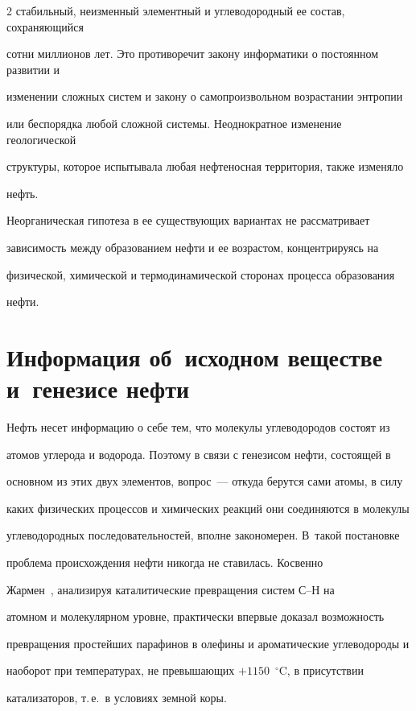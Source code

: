 \begin{multicols}{2}
стабильный, неизменный элементный и углеводородный ее состав, сохраняющийся 

сотни миллионов лет. Это противоречит закону информатики о постоянном развитии и 

изменении сложных систем и закону о самопроизвольном возрастании энтропии 

или беспорядка любой сложной системы. Неоднократное изменение геологической 

структуры, которое испытывала любая нефтеносная территория, также изменяло 

нефть. 

     

     Неорганическая гипотеза в ее существующих вариантах не рассматривает 

зависимость между образованием нефти и ее возрастом, концентрируясь на 

физической, химической и термодинамической сторонах процесса образования 

нефти.

     

\section{Информация об~исходном веществе и~генезисе нефти}



     Нефть несет информацию о себе тем, что молекулы углеводородов состоят из 

атомов углерода и водорода. Поэтому в связи с генезисом нефти, состоящей в 

основном из этих двух элементов, вопрос~--- откуда берутся сами атомы, в силу 

каких физических процессов и химических реакций они соединяются в молекулы 

углеводородных последовательностей, вполне закономерен. В~такой постановке 

проблема происхождения нефти никогда не ставилась. Косвенно 

Жармен~\cite{33s}, анализируя каталитические превращения систем С--Н на 

атомном и молекулярном уровне, практически впервые доказал возможность 

превращения простейших парафинов в олефины и ароматические углеводороды и 

наоборот при температурах, не превышающих $+1150$~$^\circ$C, в присутствии 

катализаторов, т.\,е.\ в условиях земной коры.


\end{multicols}
